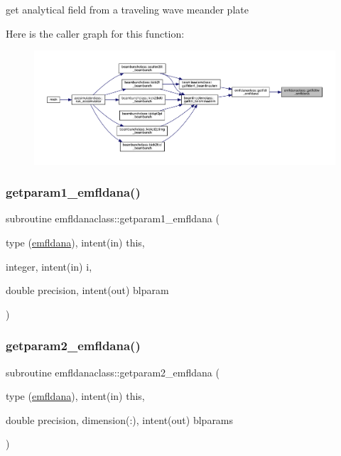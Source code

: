 get analytical field from a traveling wave meander plate 

Here is the caller graph for this function\+:\nopagebreak
\begin{figure}[H]
\begin{center}
\leavevmode
\includegraphics[width=350pt]{namespaceemfldanaclass_a49f218450fbccc7099479730313a5ec1_icgraph}
\end{center}
\end{figure}
\mbox{\label{namespaceemfldanaclass_ae345ffd1b3393ca091f8cdf3409e3088}} 
\subsubsection{\texorpdfstring{getparam1\_emfldana()}{getparam1\_emfldana()}}
{\footnotesize\ttfamily subroutine emfldanaclass\+::getparam1\+\_\+emfldana (\begin{DoxyParamCaption}\item[{type (\mbox{\hyperlink{namespaceemfldanaclass_structemfldanaclass_1_1emfldana}{emfldana}}), intent(in)}]{this,  }\item[{integer, intent(in)}]{i,  }\item[{double precision, intent(out)}]{blparam }\end{DoxyParamCaption})}

\mbox{\label{namespaceemfldanaclass_ae0015cdb617a1920e47dbc2274fb77b2}} 
\subsubsection{\texorpdfstring{getparam2\_emfldana()}{getparam2\_emfldana()}}
{\footnotesize\ttfamily subroutine emfldanaclass\+::getparam2\+\_\+emfldana (\begin{DoxyParamCaption}\item[{type (\mbox{\hyperlink{namespaceemfldanaclass_structemfldanaclass_1_1emfldana}{emfldana}}), intent(in)}]{this,  }\item[{double precision, dimension(\+:), intent(out)}]{blparams }\end{DoxyParamCaption})}

